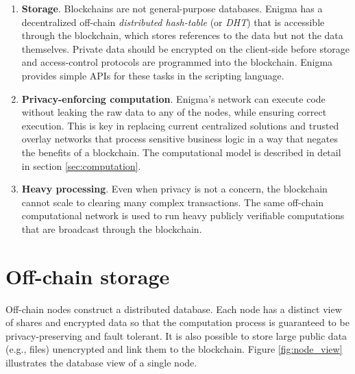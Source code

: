 \documentclass{article} \usepackage{nips13submit_e,times}
\begin{document}
\begin{enumerate}
	\item \textbf{Storage}. Blockchains are not general-purpose databases. Enigma has a decentralized off-chain \textit{distributed hash-table} (or \textit{DHT}) that is accessible through the blockchain, which stores references to the data but not the data themselves. Private data should be encrypted on the client-side before storage and access-control protocols are programmed into the blockchain. Enigma provides simple APIs for these tasks in the scripting language.
	
	\item \textbf{Privacy-enforcing computation}. Enigma's network can execute code without leaking the raw data to any of the nodes, while ensuring correct execution. This is key in replacing current centralized solutions and trusted overlay networks that process sensitive business logic in a way that negates the benefits of a blockchain. The computational model is described in detail in section \ref{sec:computation}.
	
	\item \textbf{Heavy processing}. Even when privacy is not a concern, the blockchain cannot scale to clearing many complex transactions. The same off-chain computational network is used to run heavy publicly verifiable computations that are broadcast through the blockchain.
	
\end{enumerate}

















\section{Off-chain storage}
\label{sec:storage}

Off-chain nodes construct a distributed database. Each node has a distinct view of shares and encrypted data so that the computation process is guaranteed to be privacy-preserving and fault tolerant. It is also possible to store large public data (e.g., files) unencrypted and link them to the blockchain. Figure \ref{fig:node_view} illustrates the database view of a single node.
\end{document}

